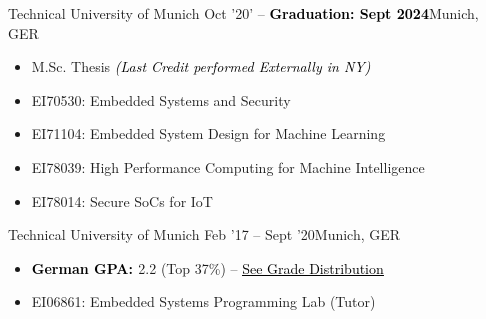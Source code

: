\documentclass[10pt,a4paper,ragged2e,withhyper]{altacv}
\begin{document}
\begin{paracol}{2}
\divider

        {Technical University of Munich}
        {Oct '20' -- {\textcolor{black}{\textbf{Graduation: Sept 2024}}}}{Munich, GER}
\begin{itemize}
\item M.Sc. Thesis {\textcolor{black}{\textit{(Last Credit performed Externally in NY)}}}
\item EI70530: Embedded Systems and Security
\item EI71104: Embedded System Design for Machine Learning
\item EI78039: High Performance Computing for Machine Intelligence
\item EI78014: Secure SoCs for IoT
\end{itemize}
\divider

        {Technical University of Munich}
        {Feb '17 -- Sept '20}{Munich, GER}
\begin{itemize}
\item \textbf{\textcolor{black}{German GPA: }} 2.2 (Top 37\%) -- \href{https://drive.google.com/file/d/1Xesfn8HF9g4oplwqPZMhcFvGFLuyVzIM/view?usp=sharing}{{\textcolor{black}{\underline{See Grade Distribution}}}}
\item EI06861: Embedded Systems Programming Lab (Tutor)
\end{itemize}


\end{paracol}
\end{document}
